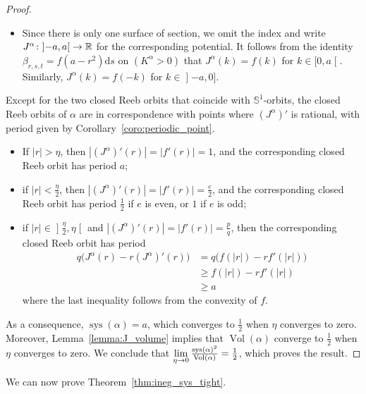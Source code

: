 \documentclass[10pt,a4paper]{amsart}
\DeclareMathOperator{\vol}{Vol}
\DeclareMathOperator{\sys}{sys}
\newcommand{\bbS}{\mathbb{S}}
\newcommand{\bbR}{\mathbb{R}}
\newcommand{\rmd}{\mathrm{d}}
\renewcommand*{\to}{\mathchoice{\longrightarrow}{\rightarrow}{\rightarrow}{\rightarrow}}
\theoremstyle{definition}\newtheorem{defi}[theo]{Definition}
\begin{document}
\begin{proof}
\begin{itemize}
\item Since there is only one surface of section, we omit the index and write $J^\alpha \colon\mathopen{]}-a, a\mathclose{[}\to \bbR$ for the corresponding potential. It follows from the identity $\beta_{r,s,t} = f(a-r^2)\rmd s$ on $(K^\alpha>0)$ that $J^\alpha(k) = f(k)$ for $k \in [0,a\mathclose{[}$. Similarly, $J^\alpha(k) = f(-k)$ for $k \in\mathopen{]}-a,0]$.
\end{itemize}
Except for the two closed Reeb orbits that coincide with $\bbS^1$-orbits, the closed Reeb orbits of $\alpha$ are in correspondence with points where $(J^{\alpha})'$ is rational, with period given by Corollary~\ref{coro:periodic_point}.
\begin{itemize}
\item If $|r| > \eta$, then $|(J^{\alpha})'(r)| = |f'(r)| = 1$, and the corresponding closed Reeb orbit has period $a$;
\item if $|r| < \frac{\eta}{2}$, then $|(J^{\alpha})'(r)| = |f'(r)| = \frac{e}{2}$, and the corresponding closed Reeb orbit has period $\frac{1}{2}$ if $e$ is even, or $1$ if $e$ is odd;
\item if $|r| \in\mathopen{]}\frac{\eta}{2},\eta\mathclose{[}$ and $|(J^{\alpha})'(r)| = |f'(r)| = \frac{p}{q}$, then the corresponding closed Reeb orbit has period
\begin{align*}
q\bigl(J^{\alpha}(r) - r (J^{\alpha})'(r)\bigr) &= q\bigl(f(|r|) - r f'(|r|)\bigr)\\
& \geq f(|r|) - r f'(|r|) \\
& \geq a
\end{align*}
where the last inequality follows from the convexity of $f$.
\end{itemize}
As a consequence, $\sys(\alpha)=a$, which converges to $\frac{1}{2}$ when $\eta$ converges to zero. Moreover, Lemma~\ref{lemma:J_volume} implies that $\vol(\alpha)$ converge to $\frac{1}{2}$ when $\eta$ converges to zero. We conclude that $\lim \limits_{\eta \to 0}\frac{\sys(\alpha)^2}{\vol(\alpha)} = \frac{1}{2}$, which proves the result.
\end{proof}

We can now prove Theorem~\ref{thm:ineg_sys_tight}.
\end{document}

